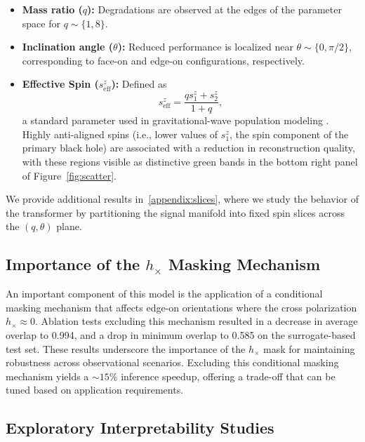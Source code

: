 \documentclass[12pt]{iopart}
\begin{document}
\begin{itemize}
    \item \textbf{Mass ratio ($q$):} Degradations are observed at the edges of 
    the parameter space for $q\sim\{1,8\}$.
    \item \textbf{Inclination angle ($\theta$):} Reduced 
    performance is localized near $\theta \sim \{0,\pi/2\}$, corresponding to face-on and edge-on configurations, respectively.
    \item \textbf{Effective Spin ($s_{\mathrm{eff}}^z$):} Defined as
    \begin{equation}
    s_{\mathrm{eff}}^z = \frac{q s_1^z + s_2^z}{1 + q},
    \end{equation}
    a standard parameter used in gravitational-wave population modeling \cite{PhysRevLett.116.241102}. Highly anti-aligned spins (i.e., lower values of $s_1^z$, the spin component of the primary black hole) are associated with a reduction in reconstruction quality, with these regions visible as distinctive green bands in the bottom right panel of Figure~\ref{fig:scatter}.
\end{itemize}
We provide additional results in~\ref{appendix:slices}, where we study the behavior of the transformer by partitioning the signal manifold into fixed spin slices across the \((q, \theta)\) plane. 


\subsection{Importance of the $h_{\times}$ Masking Mechanism}
\label{sec:mask_effect}

An important component of this model is the application of a conditional masking mechanism that affects edge-on orientations where the cross polarization $h_{\times} \approx 0$. Ablation tests excluding this mechanism resulted in a decrease in average overlap to 0.994, and a drop in minimum overlap to 0.585 on the surrogate-based test set. These results underscore the importance of the $h_{\times}$ mask for maintaining robustness across observational scenarios. Excluding this conditional masking mechanism yields a $\sim15\%$ inference speedup, offering a trade-off that can be tuned based on application requirements.



\subsection{Exploratory Interpretability Studies} 
\end{document}
